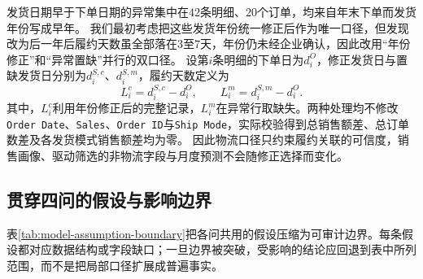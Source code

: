 发货日期早于下单日期的异常集中在$42$条明细、$20$个订单，均来自年末下单而发货年份写成早年。%
我们最初考虑把这些发货年份统一修正后作为唯一口径，但发现改为后一年后履约天数虽全部落在$3$至$7$天，年份仍未经企业确认，因此改用“年份修正”和“异常置缺”并行的双口径。%
设第$i$条明细的下单日为$d_i^O$，修正发货日与置缺发货日分别为$d_i^{S,c}$、$d_i^{S,m}$，履约天数定义为
\begin{equation}
L_i^{c}=d_i^{S,c}-d_i^O,\qquad
L_i^{m}=d_i^{S,m}-d_i^O.
\label{eq:dual-logistics-date}
\end{equation}
其中，$L_i^{c}$利用年份修正后的完整记录，$L_i^{m}$在异常行取缺失。两种处理均不修改\texttt{Order Date}、\texttt{Sales}、\texttt{Order ID}与\texttt{Ship Mode}，实际校验得到总销售额差、总订单数差及各发货模式销售额差均为零。%
因此物流口径只约束履约关联的可信度，销售画像、驱动筛选的非物流字段与月度预测不会随修正选择而变化。

\subsection{贯穿四问的假设与影响边界}

表\ref{tab:model-assumption-boundary}把各问共用的假设压缩为可审计边界。每条假设都对应数据结构或字段缺口；一旦边界被突破，受影响的结论应回退到表中所列范围，而不是把局部口径扩展成普遍事实。

